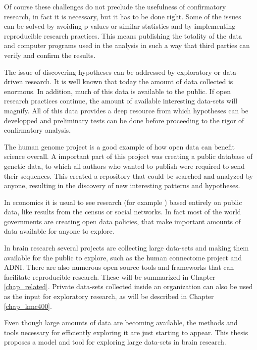 Of course these challenges do not preclude the usefulness of confirmatory research, in fact it is necessary, but it has to be done right. Some of the issues can be solved by avoiding p-values or similar statistics and by implementing reproducible research practices. This means publishing the totality of the data and computer programs used in the analysis in such a way that third parties can verify and confirm the results.

The issue of discovering hypotheses can be addressed by exploratory or data-driven research. It is well known that today the amount of data collected is enormous. In addition, much of this data is available to the public. If open research practices continue, the amount of available interesting data-sets will magnify. All of this data provides a deep resource from which hypotheses can be developped and preliminary tests can be done before proceeding to the rigor of confirmatory analysis.

The human genome project \autocite{green_human_2015} is a good example of how open data can benefit science overall. A important part of this project was creating a public database of genetic data, to which all authors who wanted to publish were required to send their sequences. This created a repository that could be searched and analyzed by anyone, resulting in the discovery of new interesting patterns and hypotheses.

In economics it is usual to see research (for example \autocite{levitt_freakonomics_2006}) based entirely on public data, like results from the census or social networks. In fact most of the world governments are creating open data policies, that make important amounts of data available for anyone to explore.

In brain research several projects are collecting large data-sets and making them available for the public to explore, such as the human connectome project\autocite{rosen_human_2010} and ADNI\autocite{jack_alzheimers_2008}. There are also numerous open source tools and frameworks that can facilitate reproducible research. These will be summarized in Chapter \ref{chap_related}. Private data-sets collected inside an organization can also be used as the input for exploratory research, as will be described in Chapter \ref{chap_kmc400}.

Even though large amounts of data are becoming available, the methods and tools necessary for efficiently exploring it are just starting to appear. This thesis proposes a model and tool for exploring large data-sets in brain research.

